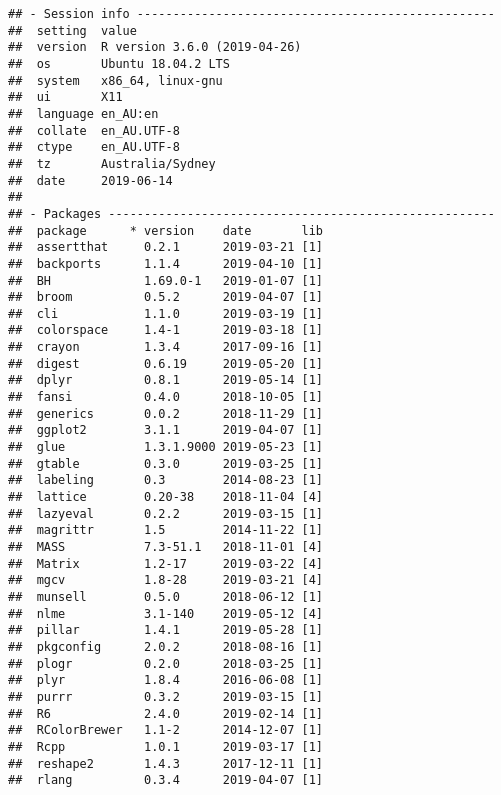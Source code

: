 \begin{Shaded}
\begin{Highlighting}[]
\OperatorTok{::}\NormalTok{(}\NormalTok{(}\NormalTok{, }\NormalTok{, }\NormalTok{))}
\end{Highlighting}
\end{Shaded}

\begin{verbatim}
## - Session info --------------------------------------------------
##  setting  value                       
##  version  R version 3.6.0 (2019-04-26)
##  os       Ubuntu 18.04.2 LTS          
##  system   x86_64, linux-gnu           
##  ui       X11                         
##  language en_AU:en                    
##  collate  en_AU.UTF-8                 
##  ctype    en_AU.UTF-8                 
##  tz       Australia/Sydney            
##  date     2019-06-14                  
## 
## - Packages ------------------------------------------------------
##  package      * version    date       lib
##  assertthat     0.2.1      2019-03-21 [1]
##  backports      1.1.4      2019-04-10 [1]
##  BH             1.69.0-1   2019-01-07 [1]
##  broom          0.5.2      2019-04-07 [1]
##  cli            1.1.0      2019-03-19 [1]
##  colorspace     1.4-1      2019-03-18 [1]
##  crayon         1.3.4      2017-09-16 [1]
##  digest         0.6.19     2019-05-20 [1]
##  dplyr          0.8.1      2019-05-14 [1]
##  fansi          0.4.0      2018-10-05 [1]
##  generics       0.0.2      2018-11-29 [1]
##  ggplot2        3.1.1      2019-04-07 [1]
##  glue           1.3.1.9000 2019-05-23 [1]
##  gtable         0.3.0      2019-03-25 [1]
##  labeling       0.3        2014-08-23 [1]
##  lattice        0.20-38    2018-11-04 [4]
##  lazyeval       0.2.2      2019-03-15 [1]
##  magrittr       1.5        2014-11-22 [1]
##  MASS           7.3-51.1   2018-11-01 [4]
##  Matrix         1.2-17     2019-03-22 [4]
##  mgcv           1.8-28     2019-03-21 [4]
##  munsell        0.5.0      2018-06-12 [1]
##  nlme           3.1-140    2019-05-12 [4]
##  pillar         1.4.1      2019-05-28 [1]
##  pkgconfig      2.0.2      2018-08-16 [1]
##  plogr          0.2.0      2018-03-25 [1]
##  plyr           1.8.4      2016-06-08 [1]
##  purrr          0.3.2      2019-03-15 [1]
##  R6             2.4.0      2019-02-14 [1]
##  RColorBrewer   1.1-2      2014-12-07 [1]
##  Rcpp           1.0.1      2019-03-17 [1]
##  reshape2       1.4.3      2017-12-11 [1]
##  rlang          0.3.4      2019-04-07 [1]

\end{verbatim}
